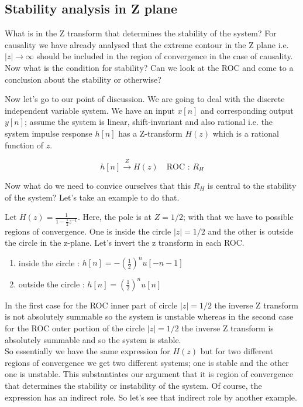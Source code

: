 \subsection{Stability analysis in Z plane}
What is in the Z transform that determines the stability of the system? For causality we have already analysed that the extreme contour in the Z plane i.e. $|z| \rightarrow \infty $ should be included in the region of convergence in the case of causality. Now what is the condition for stability? Can we look at the ROC and come to a conclusion about the stability or otherwise? 

Now let’s go to our point of discussion. We are going to deal with the discrete independent variable system. We have an input $x[n]$ and corresponding output $y[n]$; assume the system is linear, shift-invariant and also rational i.e. the system impulse response $h[n]$ has a Z-transform $H(z)$ which is a rational function of $z$.

$$h[n] \xrightarrow{Z} H(z) \quad \text{ROC : } R_H$$

Now what do we need to convice ourselves that this $R_H$ is central to the stability of the system? Let's take an example to do that.

Let $H(z) = \frac{1}{1 - \frac{1}{2}z^{-1}}$. Here, the pole is at $Z = 1/2$; with that we have to possible regions of convergence. One is inside the circle $|z| = 1/2$ and the other is outside the circle in the z-plane. Let's invert the z transform in each ROC.

\begin{enumerate}
\item inside the circle : $h[n] = -\left(\frac{1}{2}\right)^nu[-n-1]$
\item outside the circle : $h[n] = \left(\frac{1}{2}\right)^nu[n]$
\end{enumerate}


In the first case for the ROC inner part of circle $|z| = 1/2$ the inverse Z transform is not absolutely summable so the system is unstable whereas in the second case for the ROC outer portion of the circle $|z| = 1/2$ the inverse Z transform is absolutely summable and so the system is stable.\\

So essentially we have the same expression for $H(z)$ but for two different regions of convergence we get two different systems; one is stable and the other one is unstable. This substantiates our argument that it is region of convergence that determines the stability or instability of the system. Of course, the expression has an indirect role. So let’s see that indirect role by another example.

